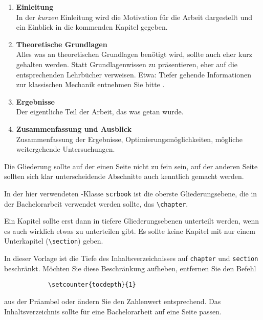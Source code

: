 \begin{enumerate}
    \item \textbf{Einleitung}\\
        In der \emph{kurzen} Einleitung wird die Motivation für die Arbeit
        dargestellt und ein Einblick in die kommenden Kapitel gegeben.
    \item \textbf{Theoretische Grundlagen}\\
        Alles was an theoretischen Grundlagen benötigt wird, sollte auch eher kurz gehalten werden.
        Statt Grundlagenwissen zu präsentieren, eher auf die entsprechenden Lehrbücher verweisen.
        Etwa: Tiefer gehende Informationen zur klassischen Mechanik entnehmen Sie bitte \cite{kuypers}.
    \item \textbf{Ergebnisse} \\
        Der eigentliche Teil der Arbeit, das was getan wurde.
    \item \textbf{Zusammenfassung und Ausblick} \\
        Zusammenfassung der Ergebnisse, Optimierungsmöglichkeiten, mögliche weitergehende Untersuchungen.
\end{enumerate}

Die Gliederung sollte auf der einen Seite nicht zu fein sein, auf der anderen Seite
sollten sich klar unterscheidende Abschnitte auch kenntlich gemacht werden.

In der hier verwendeten \KOMAScript-Klasse \texttt{scrbook} ist die oberste Gliederungsebene,
die in der Bachelorarbeit verwendet werden sollte, das \texttt{\textbackslash chapter}.

Ein Kapitel sollte erst dann in tiefere Gliederungsebenen unterteilt werden, wenn es auch wirklich etwas zu unterteilen gibt. Es sollte keine Kapitel mit nur einem Unterkapitel (\texttt{\textbackslash section}) geben.

In dieser Vorlage ist die Tiefe des Inhaltsverzeichnisses auf \texttt{chapter} und \texttt{section} beschränkt. Möchten Sie diese Beschränkung aufheben, entfernen Sie den Befehl
\begin{verbatim}
            \setcounter{tocdepth}{1}
\end{verbatim}
aus der Präambel oder ändern Sie den Zahlenwert entsprechend. Das Inhaltsverzeichnis sollte für eine Bachelorarbeit auf eine Seite passen.

